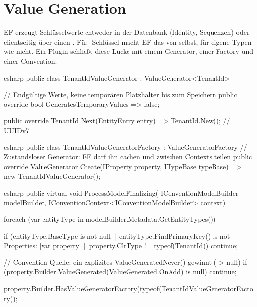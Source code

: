 \chapter{Value Generation}\label{ch:value-generation}

EF erzeugt Schlüsselwerte entweder in der Datenbank (Identity, Sequenzen) oder clientseitig
über einen . Für -Schlüssel macht EF das von
selbst, für eigene Typen wie  nicht. Ein Plugin schließt diese
Lücke mit einem Generator, einer Factory und einer Convention:

\begin{sourcecode}{csharp}
public class TenantIdValueGenerator : ValueGenerator<TenantId>
{
    // Endgültige Werte, keine temporären Platzhalter bis zum Speichern
    public override bool GeneratesTemporaryValues => false;

    public override TenantId Next(EntityEntry entry) => TenantId.New();   // UUIDv7
}
\end{sourcecode}

\begin{sourcecode}{csharp}
public class TenantIdValueGeneratorFactory : ValueGeneratorFactory
{
    // Zustandsloser Generator: EF darf ihn cachen und zwischen Contexts teilen
    public override ValueGenerator Create(IProperty property, ITypeBase typeBase)
        => new TenantIdValueGenerator();
}
\end{sourcecode}

\begin{sourcecode}{csharp}
public virtual void ProcessModelFinalizing(
    IConventionModelBuilder modelBuilder,
    IConventionContext<IConventionModelBuilder> context)
{
    foreach (var entityType in modelBuilder.Metadata.GetEntityTypes())
    {
        if (entityType.BaseType is not null
            || entityType.FindPrimaryKey() is not { Properties: [var property] }
            || property.ClrType != typeof(TenantId))
            continue;

        // Convention-Quelle: ein explizites ValueGeneratedNever() gewinnt (-> null)
        if (property.Builder.ValueGenerated(ValueGenerated.OnAdd) is null)
            continue;

        property.Builder.HasValueGeneratorFactory(typeof(TenantIdValueGeneratorFactory));
    }
}
\end{sourcecode}

